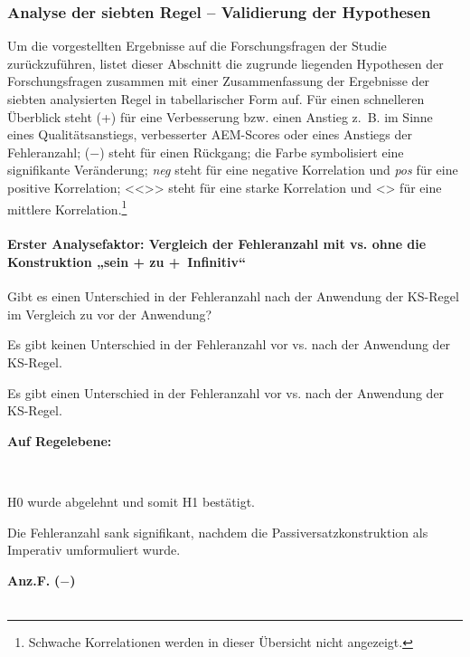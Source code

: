 \subsubsection{\label{sec:5.3.7.7}Analyse der siebten Regel -- Validierung der Hypothesen}

Um die vorgestellten Ergebnisse auf die Forschungsfragen der Studie zurückzuführen, listet dieser Abschnitt die zugrunde liegenden Hypothesen der Forschungsfragen zusammen mit einer Zusammenfassung der Ergebnisse der siebten analysierten Regel in tabellarischer Form auf. Für einen schnelleren Überblick steht (+) für eine Verbesserung bzw. einen Anstieg z.~B. im Sinne eines Qualitätsanstiegs, verbesserter AEM-Scores oder eines Anstiegs der Fehleranzahl; ($-$) steht für einen Rückgang; die  Farbe symbolisiert eine signifikante Veränderung; \textit{neg} steht für eine negative Korrelation und \textit{pos} für eine positive Korrelation; <{}<{}>{}> steht für eine starke Korrelation und <> für eine mittlere Korrelation.\footnote{\textrm{Schwache Korrelationen werden in dieser Übersicht nicht angezeigt.}}


\paragraph*{Erster Analysefaktor: Vergleich der Fehleranzahl mit vs. ohne die Konstruktion „sein + zu +~Infinitiv“}
\begin{description}[font=\normalfont\bfseries]
\item [Fragestellung:] Gibt es einen Unterschied in der Fehleranzahl nach der Anwendung der KS-Regel im Vergleich zu vor der Anwendung?
\item [H0 --] Es gibt keinen Unterschied in der Fehleranzahl vor vs. nach der Anwendung der KS-Regel.
\item [H1 --] Es gibt einen Unterschied in der Fehleranzahl vor vs. nach der Anwendung der KS-Regel.
\item [Resultat]
\end{description}
\noindent
\parbox[t]{.8\textwidth}{\textbf{Auf Regelebene:}}\\
\parbox[t]{.8\textwidth}{
H0 wurde abgelehnt und somit H1 bestätigt.

Die Fehleranzahl sank signifikant, nachdem die Passiversatzkonstruktion als Imperativ umformuliert wurde.
}
\parbox[t]{.04\textwidth}{}
\colorbox{smGreen}{\parbox[t]{.15\textwidth}{
{ \textbf{Anz.F.}} \textbf{($-$)}\\
\\
}}

